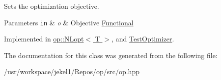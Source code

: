Sets the optimization objective. 


\begin{DoxyParams}[1]{Parameters}
\mbox{\tt in}  & {\em o} & Objective \hyperlink{classop_1_1Functional}{Functional} \\
\hline
\end{DoxyParams}


Implemented in \hyperlink{classop_1_1NLopt_afe2f2eca4b0fd4b8d2aa0e819f8bd83f}{op\-::\-N\-Lopt$<$ T $>$}, and \hyperlink{classTestOptimizer_acf4e70d78cbbb9dd44e002575d4477f7}{Test\-Optimizer}.



The documentation for this class was generated from the following file\-:\begin{DoxyCompactItemize}
\item 
/usr/workspace/jekel1/\-Repos/op/src/op.\-hpp\end{DoxyCompactItemize}
